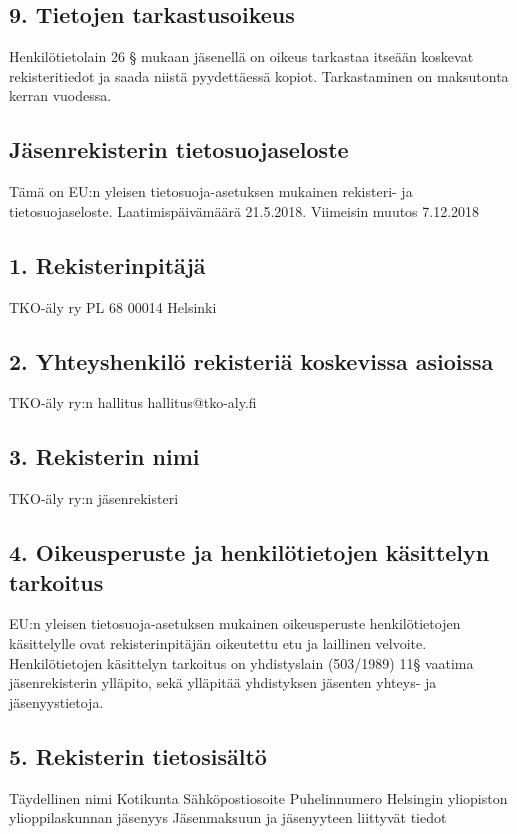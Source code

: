 \documentclass[finnish]{tktltiki}
\begin{document}
\subsection*{9. Tietojen tarkastusoikeus}
Henkilötietolain 26 § mukaan jäsenellä on oikeus tarkastaa itseään koskevat rekisteritiedot ja saada niistä pyydettäessä kopiot. Tarkastaminen on maksutonta kerran vuodessa.

\pagestyle{empty}


\subsection*{Jäsenrekisterin tietosuojaseloste}
Tämä on EU:n yleisen tietosuoja-asetuksen mukainen rekisteri- ja tietosuojaseloste.
Laatimispäivämäärä 21.5.2018. Viimeisin muutos 7.12.2018
\subsection*{1. Rekisterinpitäjä}

TKO-äly ry
PL 68
00014 Helsinki
\subsection*{2. Yhteyshenkilö rekisteriä koskevissa asioissa}

TKO-äly ry:n hallitus
hallitus@tko-aly.fi
\subsection*{3. Rekisterin nimi}

TKO-äly ry:n jäsenrekisteri
\subsection*{4. Oikeusperuste ja henkilötietojen käsittelyn tarkoitus}

EU:n yleisen tietosuoja-asetuksen mukainen oikeusperuste henkilötietojen käsittelylle ovat
rekisterinpitäjän oikeutettu etu ja laillinen velvoite.
Henkilötietojen käsittelyn tarkoitus on yhdistyslain (503/1989) 11§ vaatima jäsenrekisterin
ylläpito, sekä ylläpitää yhdistyksen jäsenten yhteys- ja jäsenyystietoja.

\subsection*{5. Rekisterin tietosisältö}
Täydellinen nimi
Kotikunta
Sähköpostiosoite
Puhelinnumero
Helsingin yliopiston ylioppilaskunnan jäsenyys
Jäsenmaksuun ja jäsenyyteen liittyvät tiedot
\end{document}
